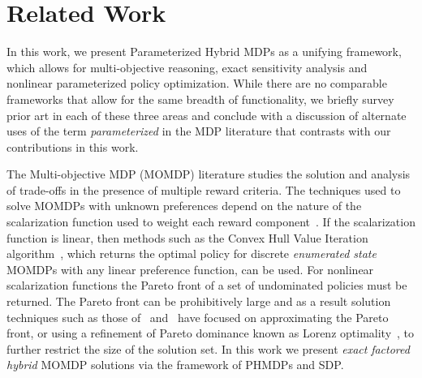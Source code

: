 \section{Related Work}
\label{sec:background}


In this work, we present Parameterized Hybrid MDPs as a unifying framework, which allows for multi-objective reasoning, exact sensitivity analysis and nonlinear parameterized policy optimization. While there are no comparable frameworks that allow for the same breadth of functionality, we briefly survey prior art in each of these three areas and conclude with a discussion of alternate uses of the term \emph{parameterized} in the MDP literature that contrasts with our contributions in this work.

The Multi-objective MDP (MOMDP) literature studies the solution and analysis of trade-offs in the presence of multiple reward criteria. The techniques used to solve MOMDPs with unknown preferences depend on the nature of the scalarization function used to weight each reward component~\parencite{Roijers_JAIR_2013}. If the scalarization function is linear, then methods such as the Convex Hull Value Iteration algorithm~\parencite{Barrett_ICML_2008}, which returns the optimal policy for discrete \emph{enumerated state} MOMDPs with any linear preference function, can be used. For nonlinear scalarization functions the Pareto front of a set of undominated policies must be returned. The Pareto front can be prohibitively large and as a result solution techniques such as those of~\parencite{Chatterjee_STACS_2006} and~\parencite{Pirotta_AAAI_2015} have focused on approximating the Pareto front, or using a refinement of Pareto dominance known as Lorenz optimality~\parencite{Perny_AAAI_2013}, to further restrict the size of the solution set.  %
In this work we present \textit{exact} \emph{factored hybrid} MOMDP solutions via the framework of PHMDPs and SDP.

